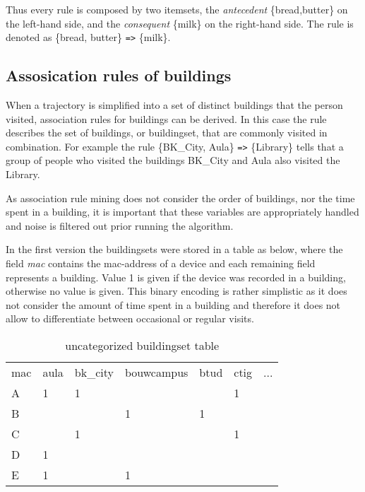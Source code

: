 Thus every rule is composed by two itemsets, the \textit{antecedent} \{bread,butter\} on the left-hand side, and the \textit{consequent} \{milk\} on the right-hand side. The rule is denoted as \{bread, butter\} \verb|=>| \{milk\}.

\subsection{Assosication rules of buildings}
When a trajectory is simplified into a set of distinct buildings that the person
visited, association rules for buildings can be derived. In this case the rule
describes the set of buildings, or buildingset, that are commonly visited in
combination. For example the rule \{BK\_City, Aula\} \verb|=>| \{Library\}
tells that a group of people who visited the buildings BK\_City and Aula also
visited the Library.

As association rule mining does not consider the order of buildings, nor the
time spent in a building, it is important that these variables are appropriately
handled and noise is filtered out prior running the algorithm.

In the first version the buildingsets were stored in a table as below, where the
field \textit{mac} contains the mac-address of a device and each remaining field
represents a building. Value 1 is given if the device was recorded in a
building, otherwise no value is given. This binary encoding is rather simplistic
as it does not consider the amount of time spent in a building and therefore it
does not allow to differentiate between occasional or regular visits.

\begin{table}[H]
\centering
\captionsetup{justification=centering}
\caption{uncategorized buildingset table}
\label{uncategorized buildingset table}
\begin{tabular}{lllllll}
\cline{1-7}
mac & aula & bk\_city & bouwcampus & btud & ctig & ... \\ \cline{1-7}
A   & 1	& 1    	&        	&  	& 1	& 	\\
B   &  	&      	& 1      	& 1	&  	& 	\\
C   &  	& 1    	&        	&  	& 1	& 	\\
D   & 1	&      	&        	&  	&  	& 	\\
E   & 1	&      	& 1      	&  	&  	& 	\\ \cline{1-7}
\end{tabular}
\end{table}

